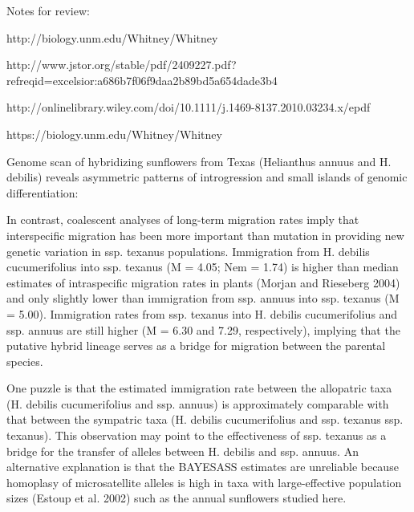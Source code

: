 \documentclass[11pt]{article}
\begin{document}
\begin{enumerate}
Notes for review:

http://biology.unm.edu/Whitney/Whitney%

http://www.jstor.org/stable/pdf/2409227.pdf?refreqid=excelsior:a686b7f06f9daa2b89bd5a654dade3b4


http://onlinelibrary.wiley.com/doi/10.1111/j.1469-8137.2010.03234.x/epdf

https://biology.unm.edu/Whitney/Whitney%

Genome scan of hybridizing sunflowers from Texas
(Helianthus annuus and H. debilis) reveals asymmetric
patterns of introgression and small islands of genomic
differentiation:

In contrast, coalescent analyses of long-term migration
rates imply that interspecific migration has been
more important than mutation in providing new genetic
variation in ssp. texanus populations. Immigration from
H. debilis cucumerifolius into ssp. texanus (M = 4.05;
Nem = 1.74) is higher than median estimates of intraspecific
migration rates in plants (Morjan and Rieseberg 2004) 
and only slightly lower than immigration from
ssp. annuus into ssp. texanus (M = 5.00). Immigration
rates from ssp. texanus into H. debilis cucumerifolius and
ssp. annuus are still higher (M = 6.30 and 7.29, respectively),
implying that the putative hybrid lineage serves
as a bridge for migration between the parental species.

One puzzle is
that the estimated immigration rate between the allopatric
taxa (H. debilis cucumerifolius and ssp. annuus) is
approximately comparable with that between the sympatric
taxa (H. debilis cucumerifolius and ssp. texanus ssp.
texanus). This observation may point to the effectiveness
of ssp. texanus as a bridge for the transfer of alleles
between H. debilis and ssp. annuus. An alternative explanation
is that the BAYESASS estimates are unreliable
because homoplasy of microsatellite alleles is high in
taxa with large-effective population sizes (Estoup et al.
2002) such as the annual sunflowers studied here.


\end{enumerate}
\end{document}
